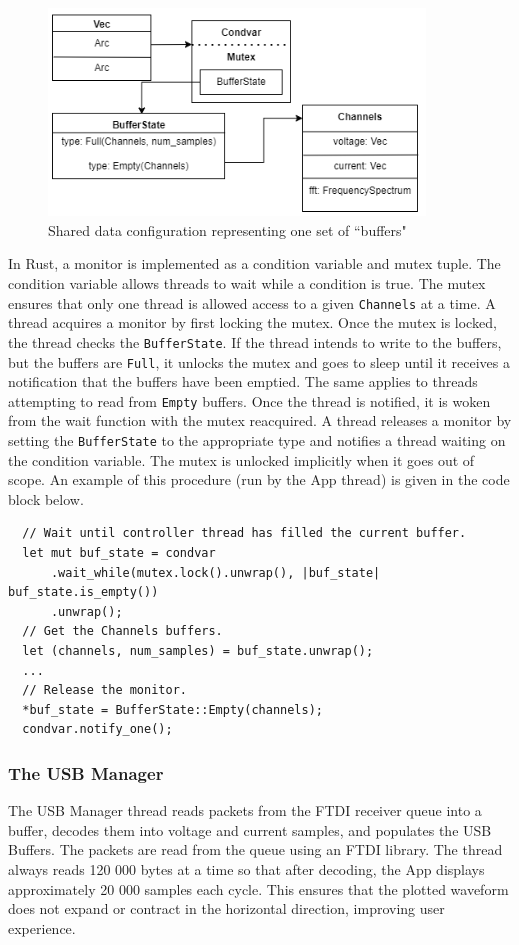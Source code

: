 \documentclass[letterpaper,11pt]{article}
\newcommand{\code}[1]{\texttt{#1}}
\begin{document}
\begin{figure}[H]
  \centering
  \includegraphics[width=10cm]{figures/buffer_config.drawio.png}
  \caption{Shared data configuration representing one set of ``buffers"}
  \label{fig:soft-buffer-config}
\end{figure}

In Rust, a monitor is implemented as a condition variable and mutex tuple. The condition
variable allows threads to wait while a condition is true. The mutex ensures that only
one thread is allowed access to a given \code{Channels} at a time. A thread acquires a
monitor by first locking the mutex. Once the mutex is locked, the thread checks the
\code{BufferState}. If the thread intends to write to the buffers, but the buffers are
\code{Full}, it unlocks the mutex and goes to sleep until it receives a notification
that the buffers have been emptied. The same applies to threads attempting to read from
\code{Empty} buffers. Once the thread is notified, it is woken from the wait function
with the mutex reacquired. A thread releases a monitor by setting the \code{BufferState}
to the appropriate type and notifies a thread waiting on the condition variable. The
mutex is unlocked implicitly when it goes out of scope. An example of this procedure
(run by the App thread) is given in the code block below.

\begin{verbatim}
  // Wait until controller thread has filled the current buffer.
  let mut buf_state = condvar
      .wait_while(mutex.lock().unwrap(), |buf_state| buf_state.is_empty())
      .unwrap();
  // Get the Channels buffers.
  let (channels, num_samples) = buf_state.unwrap();
  ...
  // Release the monitor.
  *buf_state = BufferState::Empty(channels);
  condvar.notify_one();
\end{verbatim}

\subsubsection{The USB Manager}
The USB Manager thread reads packets from the FTDI receiver queue into a buffer,
decodes them into voltage and current samples, and populates the USB Buffers.
The packets are read from the queue using an FTDI library. The thread always
reads 120 000 bytes at a time so that after decoding, the App displays
approximately 20 000 samples each cycle. This ensures that the plotted waveform
does not expand or contract in the horizontal direction, improving user experience.
\end{document}
